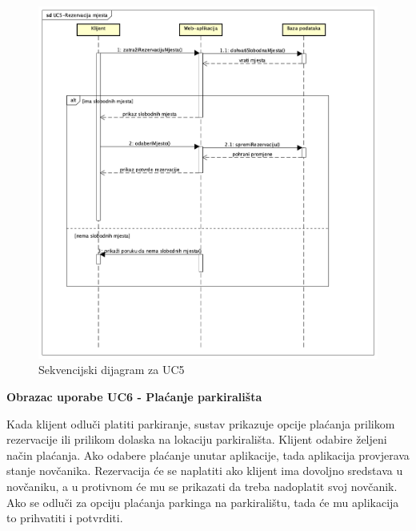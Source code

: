 				   \pagebreak
				   
				   
				   
				   
				    \begin{figure}[hbt!]
				    	\centering
				    	\includegraphics[width=0.7\linewidth]{slike/mjesto.png}
				    	\caption{Sekvencijski dijagram za UC5}
				    	\label{fig:mjesto}
				    \end{figure}
				    
				    
				    
				    
				    
				    
				    
				    
				    
				    
			     	
				    \textbf{Obrazac uporabe UC6 - Plaćanje parkirališta}
				    				
				     {Kada klijent odluči platiti parkiranje, sustav prikazuje opcije plaćanja prilikom rezervacije ili prilikom dolaska na lokaciju parkirališta. Klijent odabire željeni način plaćanja. Ako odabere plaćanje unutar aplikacije, tada aplikacija provjerava stanje novčanika. Rezervacija će se naplatiti ako klijent ima dovoljno sredstava u novčaniku, a u protivnom će mu se prikazati da treba nadoplatit svoj novčanik. Ako se odluči za opciju plaćanja parkinga na parkiralištu, tada će mu aplikacija to prihvatiti i potvrditi.}
				     
				     
				     
